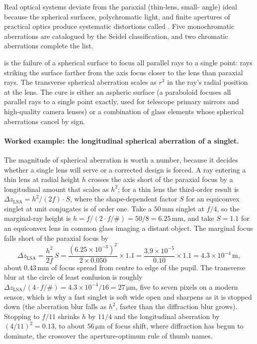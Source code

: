 Real optical systems deviate from the paraxial (thin-lens, small-
angle) ideal because the spherical surfaces, polychromatic light,
and finite apertures of practical optics produce systematic
distortions called . Five monochromatic
aberrations are catalogued by the Seidel classification, and two
chromatic aberrations complete the list.

 is the failure of a spherical surface
to focus all parallel rays to a single point: rays striking the
surface farther from the axis focus closer to the lens than paraxial
rays. The transverse spherical aberration scales as $r^{3}$ in the
ray's radial position at the lens. The cure is either an aspheric
surface (a paraboloid focuses all parallel rays to a single point
exactly, used for telescope primary mirrors and high-quality camera
lenses) or a combination of glass elements whose spherical
aberrations cancel by sign.

\paragraph{Worked example: the longitudinal spherical aberration of a singlet.}
The magnitude of spherical aberration is worth a number, because it decides
whether a single lens will serve or a corrected design is forced. A ray entering
a thin lens at radial height $h$ crosses the axis short of the paraxial focus by a
longitudinal amount that scales as $h^2$; for a thin lens the third-order result
is $\Delta z_{\mathrm{LSA}} = h^2/(2 f)\cdot S$, where the shape-dependent factor
$S$ for an equiconvex singlet at unit conjugates is of order one. Take a
$50\,\si{\milli\meter}$ singlet at $f/4$, so the marginal-ray height is
$h = f/(2\cdot f/\#) = 50/8 = 6.25\,\si{\milli\meter}$, and take $S = 1.1$ for an
equiconvex lens in common glass imaging a distant object. The marginal focus
falls short of the paraxial focus by
\[
\Delta z_{\mathrm{LSA}} = \frac{h^2}{2f}\,S
= \frac{(6.25\times 10^{-3})^2}{2\times 0.050}\times 1.1
= \frac{3.9\times 10^{-5}}{0.10}\times 1.1
= 4.3\times 10^{-4}\,\si{\meter},
\]
about $0.43\,\si{\milli\meter}$ of focus spread from centre to edge of the pupil.
The transverse blur at the circle of least confusion is roughly
$\Delta z_{\mathrm{LSA}}/(4\cdot f/\#) = 4.3\times 10^{-4}/16 = 27\,\si{\micro
\meter}$, five to seven pixels on a modern sensor, which is why a fast singlet is
soft wide open and sharpens as it is stopped down (the aberration blur falls as
$h^2$, faster than the diffraction blur grows). Stopping to $f/11$ shrinks $h$ by
$11/4$ and the longitudinal aberration by $(4/11)^2 = 0.13$, to about
$56\,\si{\micro\meter}$ of focus shift, where diffraction has begun to dominate,
the crossover the aperture-optimum rule of thumb names.

